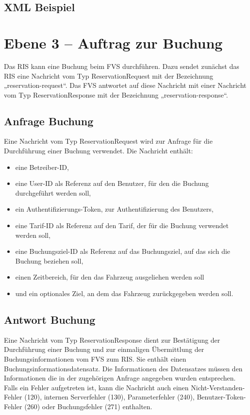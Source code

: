 

\subsection{XML Beispiel}

\section{Ebene 3 -- Auftrag zur Buchung}
Das RIS kann eine Buchung beim FVS durchführen. Dazu sendet zunächst das RIS eine Nachricht vom Typ ReservationRequest mit der Bezeichnung „reservation-request“. Das FVS antwortet auf diese Nachricht mit einer Nachricht vom Typ ReservationResponse mit der Bezeichnung „reservation-response“.



\subsection{Anfrage Buchung}
Eine Nachricht vom Typ ReservationRequest wird zur Anfrage für die Durchführung einer Buchung verwendet. Die Nachricht enthält:
\begin{itemize}
\item eine Betreiber-ID,
\item eine User-ID als Referenz auf den Benutzer, für den die Buchung durchgeführt werden soll,
\item ein Authentifizierungs-Token, zur Authentifizierung des Benutzers,
\item eine Tarif-ID als Referenz auf den Tarif, der für die Buchung verwendet werden soll,
\item eine Buchungsziel-ID als Referenz auf das Buchungsziel, auf das sich die Buchung beziehen soll,
\item einen Zeitbereich, für den das Fahrzeug ausgeliehen werden soll
\item und ein optionales Ziel, an dem das Fahrzeug zurückgegeben werden soll.
\end{itemize}



\subsection{Antwort Buchung}
Eine Nachricht vom Typ ReservationResponse dient zur Bestätigung der Durchführung einer Buchung und zur einmaligen Übermittlung der Buchungsinformationen vom FVS zum RIS. Sie enthält einen Buchungsinformationsdatensatz. Die Informationen des Datensatzes müssen den Informationen die in der zugehörigen Anfrage angegeben wurden entsprechen. Falls ein Fehler aufgetreten ist, kann die Nachricht auch einen Nicht-Verstanden-Fehler (120), internen Serverfehler (130), Parameterfehler (240), Benutzer-Token-Fehler (260) oder Buchungsfehler (271) enthalten.

